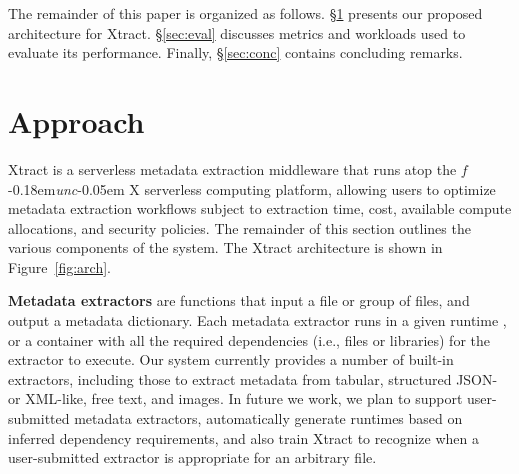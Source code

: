 \documentclass[sigconf, 9pt]{acmart}
\newcommand{\kyle}[1]{}
\newcommand{\kyle}[1]{{\textcolor{purple}{ Kyle: #1 }}}
\newcommand{\name}{Xtract}
\newcommand{\funcx}{$f$\kern-0.18em\emph{unc}\kern-0.05em X}
\begin{document}
The remainder of this paper is organized as follows. 
\S\ref{sec:approach} presents our proposed architecture for \name{}. 
\S\ref{sec:eval} discusses metrics and workloads used to evaluate its performance. 
Finally, \S\ref{sec:conc} contains concluding remarks.


\section{Approach}
\label{sec:approach}

\name{} is a serverless metadata extraction middleware that runs atop the \funcx{} serverless 
computing platform, allowing users to optimize metadata extraction workflows subject to 
extraction time, cost, available compute allocations, and security policies. %
The remainder 
of this section outlines the various components of the system. The \name{} architecture is shown in Figure~\ref{fig:arch}.

\textbf{Metadata extractors} are functions that input a file or group of files, and output a metadata dictionary. 
Each metadata extractor runs in a given runtime \kyle{runtime not defined}, or a container with all the required dependencies (i.e., files or 
libraries) for the extractor to execute.  Our system currently provides a number of built-in extractors, including
those to extract metadata from tabular, structured JSON- or XML-like, free text, and images. In future we work, 
we plan to support user-submitted metadata extractors, automatically generate runtimes based on inferred 
dependency requirements, and also train \name{} to recognize when a user-submitted extractor 
is appropriate for an arbitrary file. 
\end{document}
